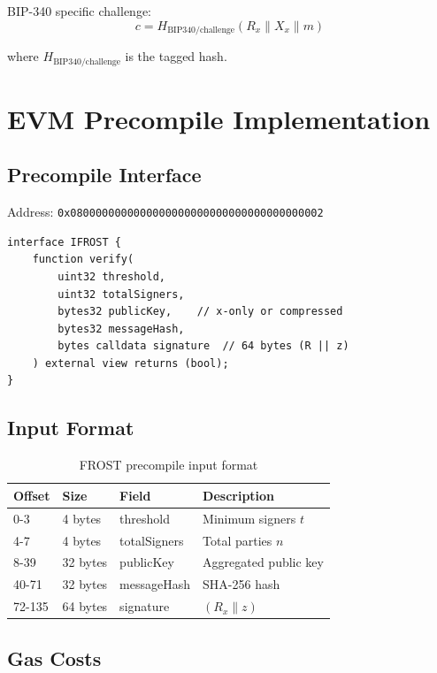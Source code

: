 \documentclass[11pt,a4paper]{article}
\theoremstyle{definition}
\begin{document}
BIP-340 specific challenge:
\[
c = H_{\text{BIP340/challenge}}(R_x \| X_x \| m)
\]

where $H_{\text{BIP340/challenge}}$ is the tagged hash.

\section{EVM Precompile Implementation}

\subsection{Precompile Interface}

Address: \texttt{0x0800000000000000000000000000000000000002}

\begin{lstlisting}[language=Solidity]
interface IFROST {
    function verify(
        uint32 threshold,
        uint32 totalSigners,
        bytes32 publicKey,    // x-only or compressed
        bytes32 messageHash,
        bytes calldata signature  // 64 bytes (R || z)
    ) external view returns (bool);
}
\end{lstlisting}

\subsection{Input Format}

\begin{table}[h]
\centering
\begin{tabular}{llll}
\toprule
Offset & Size & Field & Description \\
\midrule
0-3 & 4 bytes & threshold & Minimum signers $t$ \\
4-7 & 4 bytes & totalSigners & Total parties $n$ \\
8-39 & 32 bytes & publicKey & Aggregated public key \\
40-71 & 32 bytes & messageHash & SHA-256 hash \\
72-135 & 64 bytes & signature & $(R_x \| z)$ \\
\bottomrule
\end{tabular}
\caption{FROST precompile input format}
\end{table}

\subsection{Gas Costs}
\end{document}
